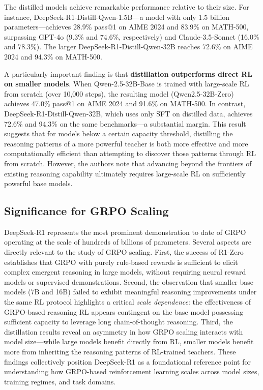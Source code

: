 The distilled models achieve remarkable performance relative to their size. For
instance, DeepSeek-R1-Distill-Qwen-1.5B---a model with only 1.5 billion
parameters---achieves 28.9\% pass@1 on AIME 2024 and 83.9\% on MATH-500, surpassing
GPT-4o (9.3\% and 74.6\%, respectively) and Claude-3.5-Sonnet (16.0\% and 78.3\%).
The larger DeepSeek-R1-Distill-Qwen-32B reaches 72.6\% on AIME 2024 and 94.3\% on
MATH-500.

A particularly important finding is that \textbf{distillation outperforms direct RL on
smaller models}. When Qwen-2.5-32B-Base is trained with large-scale RL from scratch
(over 10{,}000 steps), the resulting model (Qwen2.5-32B-Zero) achieves 47.0\% pass@1
on AIME 2024 and 91.6\% on MATH-500. In contrast, DeepSeek-R1-Distill-Qwen-32B,
which uses only SFT on distilled data, achieves 72.6\% and 94.3\% on the same
benchmarks---a substantial margin. This result suggests that for models below a
certain capacity threshold, distilling the reasoning patterns of a more powerful
teacher is both more effective and more computationally efficient than attempting to
discover those patterns through RL from scratch. However, the authors note that
advancing beyond the frontiers of existing reasoning capability ultimately requires
large-scale RL on sufficiently powerful base models.

\subsection{Significance for GRPO Scaling}

DeepSeek-R1 represents the most prominent demonstration to date of GRPO operating at
the scale of hundreds of billions of parameters. Several aspects are directly relevant
to the study of GRPO scaling. First, the success of R1-Zero establishes that GRPO
with purely rule-based rewards is sufficient to elicit complex emergent reasoning in
large models, without requiring neural reward models or supervised demonstrations.
Second, the observation that smaller base models (7B and 16B) failed to exhibit
meaningful reasoning improvements under the same RL protocol highlights a critical
\textit{scale dependence}: the effectiveness of GRPO-based reasoning RL appears
contingent on the base model possessing sufficient capacity to leverage long
chain-of-thought reasoning. Third, the distillation results reveal an asymmetry in
how GRPO scaling interacts with model size---while large models benefit directly from
RL, smaller models benefit more from inheriting the reasoning patterns of RL-trained
teachers. These findings collectively position DeepSeek-R1 as a foundational reference
point for understanding how GRPO-based reinforcement learning scales across model
sizes, training regimes, and task domains.
